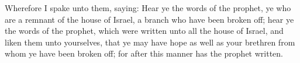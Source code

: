 \bverse \iffalse Wherefore I spake unto them, saying: Hear ye the words of the prophet, ye who are a remnant of the house of Israel, a branch who have been broken off; hear ye the words of the prophet, which were written unto all the house of Israel, and liken them unto yourselves, that ye may have hope as well as your brethren from whom ye have been broken off; for after this manner has the prophet written. \fi
Wherefore I spake unto them, saying: Hear ye the words of the prophet, ye who are a remnant of the house of Israel, a branch who have been broken off; hear ye the words of the prophet, which were written unto all the house of Israel, and liken them unto yourselves, that ye may have hope as well as your brethren from whom ye have been broken off; for after this manner has the prophet written.

